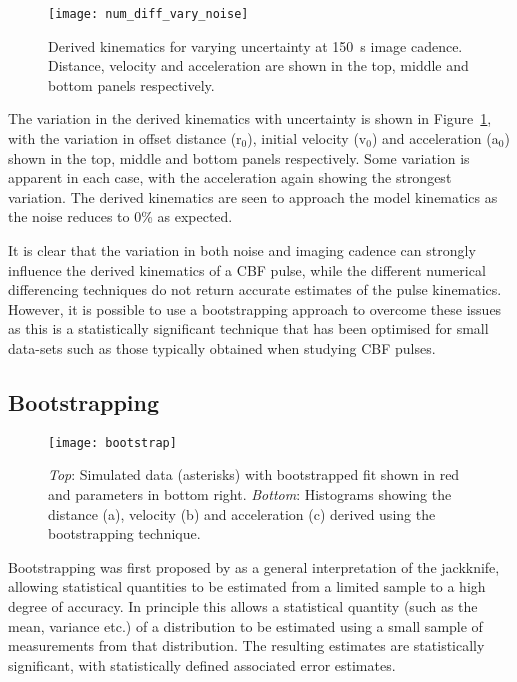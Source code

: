 \begin{figure}[!t]
\begin{center}
\texttt{[image: num\_diff\_vary\_noise]}
\caption{Derived kinematics for varying uncertainty at 150~s image cadence. Distance, velocity and acceleration are shown in the top, middle and bottom panels respectively.}
\label{fig:num_diff_vary_noise}
\end{center}
\end{figure}

The variation in the derived kinematics with uncertainty is shown in Figure~\ref{fig:num_diff_vary_noise}, with the variation in offset distance (r$_{0}$), initial velocity (v$_{0}$) and acceleration (a$_{0}$) shown in the top, middle and bottom panels respectively. Some variation is apparent in each case, with the acceleration again showing the strongest variation. The derived kinematics are seen to approach the model kinematics as the noise reduces to 0\% as expected. 

It is clear that the variation in both noise and imaging cadence can strongly influence the derived kinematics of a CBF pulse, while the different numerical differencing techniques do not return accurate estimates of the pulse kinematics. However, it is possible to use a bootstrapping approach to overcome these issues as this is a statistically significant technique that has been optimised for small data-sets such as those typically obtained when studying CBF pulses. 


\subsection{Bootstrapping}
\label{subsect:bootstrap}

\begin{figure}[!t]
\begin{center}
\texttt{[image: bootstrap]}
\caption{\emph{Top}: Simulated data (asterisks) with bootstrapped fit shown in red and parameters in bottom right. \emph{Bottom}: Histograms showing the distance (a), velocity (b) and acceleration (c) derived using the bootstrapping technique.}
\label{fig:bootstrap}
\end{center}
\end{figure}

Bootstrapping was first proposed by \citet{Efron:1979p1831} as a general interpretation of the jackknife, allowing statistical quantities to be estimated from a limited sample to a high degree of accuracy. In principle this allows a statistical quantity (such as the mean, variance etc.) of a distribution to be estimated using a small sample of measurements from that distribution. The resulting estimates are statistically significant, with statistically defined associated error estimates. 

